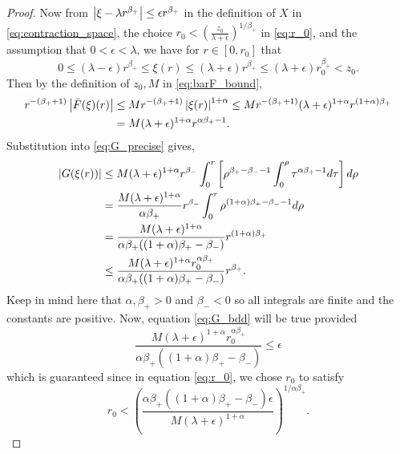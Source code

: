 \documentclass{amsart}
\begin{document}
\begin{proof}
Now from \(\left|{\xi - \lambda r^{\beta_+}}\right| \leq \epsilon r^{\beta_+}\) in the definition of \(X\) in \eqref{eq:contraction_space}, the choice \(r_0 < \left(\tfrac{z_0}{\lambda + \epsilon}\right)^{1/\beta_+}\) in \eqref{eq:r_0}, and the assumption that \(0 < \epsilon < \lambda\), we have for \(r \in [0, r_0]\) that
\[
0 \leq (\lambda - \epsilon) r^{\beta_+} \leq \xi(r) \leq (\lambda + \epsilon) r^{\beta_+} \leq (\lambda + \epsilon) r_0^{\beta_+} < z_0.
\]
Then by the definition of \(z_0, M\) in \eqref{eq:barF_bound},
\[
\begin{split}
r^{-(\beta_+ + 1)} \left|{\bar{F}(\xi)(r)}\right| &\leq M r^{-(\beta_+ + 1)} \left|{\xi(r)}\right|^{1+\alpha} \leq M r^{-(\beta_+ + 1)} (\lambda + \epsilon)^{1+\alpha} r^{(1+\alpha)\beta_+} \\
&= M(\lambda + \epsilon)^{1+\alpha} r^{\alpha\beta_+ - 1}.
\end{split}
\]
Substitution into \eqref{eq:G_precise} gives,
\[
\begin{split}
\left|{G(\xi(r))}\right| &\leq  M (\lambda + \epsilon)^{1+\alpha} r^{\beta_-} \int_0^r \left[\rho^{\beta_+ - \beta_- - 1} \int_0^{\rho} \tau^{\alpha\beta_+ - 1} d\tau\right] d\rho \\
&= \frac{M (\lambda + \epsilon)^{1+\alpha}}{\alpha\beta_+} r^{\beta_-} \int_0^r \rho^{(1+\alpha)\beta_+ - \beta_- - 1} d\rho \\
&= \frac{M (\lambda + \epsilon)^{1+\alpha}}{\alpha\beta_+((1+\alpha)\beta_+ - \beta_-)} r^{(1+\alpha)\beta_+} \\
&\leq \frac{M (\lambda + \epsilon)^{1+\alpha}r_0^{\alpha\beta_+}}{\alpha\beta_+((1+\alpha)\beta_+ - \beta_-)} r^{\beta_+}.
\end{split}
\]
Keep in mind here that \(\alpha, \beta_+ > 0\) and \(\beta_- < 0\) so all integrals are finite and the constants are positive. Now, equation \eqref{eq:G_bdd} will be true provided
\[
\frac{M (\lambda + \epsilon)^{1+\alpha}r_0^{\alpha\beta_+}}{\alpha\beta_+((1+\alpha)\beta_+ - \beta_-)} \leq \epsilon
\]
which is guaranteed since in equation \eqref{eq:r_0}, we chose \(r_0\) to satisfy
\[
r_0 < \left(\frac{\alpha\beta_+((1+\alpha)\beta_+ - \beta_-)\epsilon}{M (\lambda + \epsilon)^{1+\alpha}}\right)^{1/\alpha\beta_+}.
\]


\end{proof}
\end{document}
